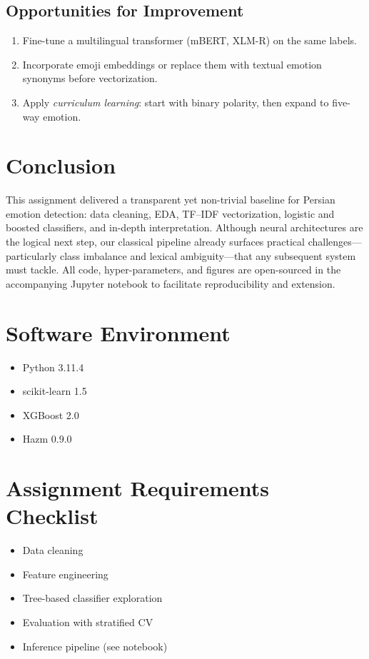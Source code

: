 \documentclass[12pt]{article}
\begin{document}
\subsection{Opportunities for Improvement}
\begin{enumerate}[label=\arabic*.]
  \item Fine-tune a multilingual transformer (mBERT, XLM-R) on the same labels.
  \item Incorporate emoji embeddings or replace them with textual emotion synonyms before vectorization.
  \item Apply \emph{curriculum learning}: start with binary polarity, then expand to five-way emotion.
\end{enumerate}

\section{Conclusion}
\label{sec:conclusion}
This assignment delivered a transparent yet non-trivial baseline for Persian
emotion detection: data cleaning, EDA, TF–IDF vectorization, logistic and
boosted classifiers, and in-depth interpretation.
Although neural architectures are the logical next step,
our classical pipeline already surfaces practical challenges—particularly
class imbalance and lexical ambiguity—that any subsequent system must tackle.
All code, hyper-parameters, and figures are open-sourced in the accompanying
Jupyter notebook to facilitate reproducibility and extension.

\appendix
\section{Software Environment}
\label{app:env}
\begin{itemize}
  \item Python 3.11.4
  \item scikit-learn 1.5
  \item XGBoost 2.0
  \item Hazm 0.9.0
\end{itemize}

\section{Assignment Requirements Checklist}
\begin{itemize}
  \item Data cleaning \checkmark
  \item Feature engineering \checkmark
  \item Tree-based classifier exploration \checkmark
  \item Evaluation with stratified CV \checkmark
  \item Inference pipeline (see notebook) \checkmark
\end{itemize}

\vspace{2em}
\end{document}
